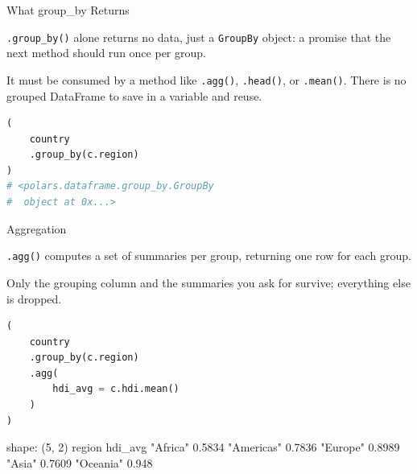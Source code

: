 \documentclass[8pt,aspectratio=169]{beamer}
\begin{document}
\begin{frame}[fragile]{What group\_by Returns}
\begin{splitcode}{%

\texttt{.group\_by()} alone returns no data, just a \texttt{GroupBy} object: a promise that the next method should run once per group.

It must be consumed by a method like \texttt{.agg()}, \texttt{.head()}, or \texttt{.mean()}. There is no grouped DataFrame to save in a variable and reuse.

}
\begin{lstlisting}[language=Python]
(
    country
    .group_by(c.region)
)
# <polars.dataframe.group_by.GroupBy
#  object at 0x...>
\end{lstlisting}
\end{splitcode}
\end{frame}

\begin{frame}[fragile]{Aggregation}
\begin{splitcode}{%

\texttt{.agg()} computes a set of summaries per group, returning one row for each group.

Only the grouping column and the summaries you ask for survive; everything else is dropped.

}
\begin{lstlisting}[language=Python]
(
    country
    .group_by(c.region)
    .agg(
        hdi_avg = c.hdi.mean()
    )
)
\end{lstlisting}
\begin{codeoutput}
shape: (5, 2)
region      hdi_avg
"Africa"    0.5834
"Americas"  0.7836
"Europe"    0.8989
"Asia"      0.7609
"Oceania"   0.948
\end{codeoutput}
\end{splitcode}
\end{frame}
\end{document}
